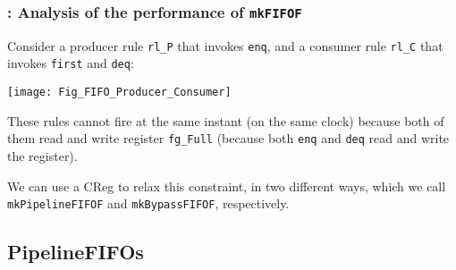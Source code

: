 
\begin{frame}[fragile]
\frametitle{{\BSV}: Analysis of the performance of {\tt mkFIFOF}}

\footnotesize

Consider a producer rule \verb|rl_P| that invokes \verb|enq|, and a
consumer rule \verb|rl_C| that invokes \verb|first| and \verb|deq|:

\vspace{4ex}

\begin{center}
 \texttt{[image: Fig\_FIFO\_Producer\_Consumer]}
\end{center}

\vspace{4ex}

These rules cannot fire at the same instant (on the same clock)
because both of them read and write register \verb|fg_Full| (because
both \verb|enq| and \verb|deq| read and write the register).

\vspace{2ex}

We can use a CReg to relax this constraint, in two different ways,
which we call {\tt mkPipelineFIFOF} and {\tt mkBypassFIFOF},
respectively.

\end{frame}


\subsection{PipelineFIFOs}

